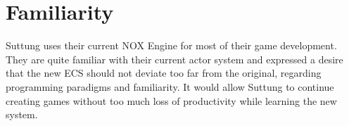 \section{Familiarity}
Suttung uses their current NOX Engine for most of their game development.
They are quite familiar with their current actor system and expressed a desire that the new
ECS should not deviate too far from the original, regarding programming paradigms and familiarity.
It would allow Suttung to continue creating games without too much loss of productivity while learning the new system.


